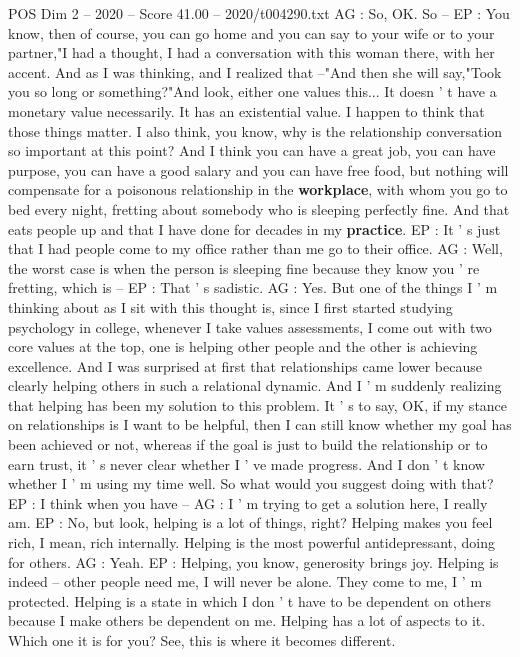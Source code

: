 \begin{textsample}{POS Dim 2 – 2020 – Score 41.00 – 2020/t004290.txt}
AG : So, OK.
So -- EP : You know, then of course, you can go home and you can say to your wife or to your partner,"I had a thought, I had a conversation with this woman there, with her accent.
And as I was thinking, and I realized that --"And then she will say,"Took you so long or something?"And look, either one values this...
It doesn ' t have a monetary value necessarily.
It has an existential value.
I happen to think that those things matter.
I also think, you know, why is the relationship conversation so important at this point?
And I think you can have a great job, you can have purpose, you can have a good salary and you can have free food, but nothing will compensate for a poisonous relationship in the \textbf{workplace}, with whom you go to bed every night, fretting about somebody who is sleeping perfectly fine.
And that eats people up and that I have done for decades in my \textbf{practice}.
EP : It ' s just that I had people come to my office rather than me go to their office.
AG : Well, the worst case is when the person is sleeping fine because they know you ' re fretting, which is -- EP : That ' s sadistic.
AG : Yes.
But one of the things I ' m thinking about as I sit with this thought is, since I first started studying psychology in college, whenever I take values assessments, I come out with two core values at the top, one is helping other people and the other is achieving excellence.
And I was surprised at first that relationships came lower because clearly helping others in such a relational dynamic.
And I ' m suddenly realizing that helping has been my solution to this problem.
It ' s to say, OK, if my stance on relationships is I want to be helpful, then I can still know whether my goal has been achieved or not, whereas if the goal is just to build the relationship or to earn trust, it ' s never clear whether I ' ve made progress.
And I don ' t know whether I ' m using my time well.
So what would you suggest doing with that?
EP : I think when you have -- AG : I ' m trying to get a solution here, I really am.
EP : No, but look, helping is a lot of things, right?
Helping makes you feel rich, I mean, rich internally.
Helping is the most powerful antidepressant, doing for others.
AG : Yeah.
EP : Helping, you know, generosity brings joy.
Helping is indeed -- other people need me, I will never be alone.
They come to me, I ' m protected.
Helping is a state in which I don ' t have to be dependent on others because I make others be dependent on me.
Helping has a lot of aspects to it.
Which one it is for you?
See, this is where it becomes different.

\end{textsample}
